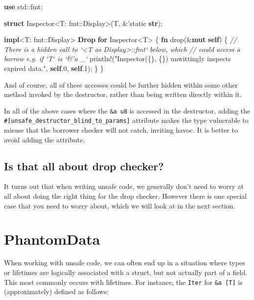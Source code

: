 \documentclass[a4paper,]{book}
\newenvironment{Shaded}{\begin{snugshade}}{\end{snugshade}}
\newcommand{\KeywordTok}[1]{\textcolor[rgb]{0.13,0.29,0.53}{\textbf{{#1}}}}
\newcommand{\DecValTok}[1]{\textcolor[rgb]{0.00,0.00,0.81}{{#1}}}
\newcommand{\StringTok}[1]{\textcolor[rgb]{0.31,0.60,0.02}{{#1}}}
\newcommand{\CommentTok}[1]{\textcolor[rgb]{0.56,0.35,0.01}{\textit{{#1}}}}
\newcommand{\OtherTok}[1]{\textcolor[rgb]{0.56,0.35,0.01}{{#1}}}
\newcommand{\NormalTok}[1]{{#1}}
\begin{document}
\begin{Shaded}
\begin{Highlighting}[]
\KeywordTok{use} \NormalTok{std::fmt;}

\KeywordTok{struct} \NormalTok{Inspector<T: fmt::Display>(T, &}\OtherTok{'static} \KeywordTok{str}\NormalTok{);}

\KeywordTok{impl}\NormalTok{<T: fmt::Display> }\KeywordTok{Drop} \KeywordTok{for} \NormalTok{Inspector<T> \{}
    \KeywordTok{fn} \NormalTok{drop(&}\KeywordTok{mut} \KeywordTok{self}\NormalTok{) \{}
        \CommentTok{// There is a hidden call to `<T as Display>::fmt` below, which}
        \CommentTok{// could access a borrow e.g. if `T` is `&'a _`}
        \OtherTok{println!}\NormalTok{(}\StringTok{"Inspector(\{\}, \{\}) unwittingly inspects expired data."}\NormalTok{,}
                 \KeywordTok{self}\NormalTok{.}\DecValTok{0}\NormalTok{, }\KeywordTok{self}\NormalTok{.}\DecValTok{1}\NormalTok{);}
    \NormalTok{\}}
\NormalTok{\}}
\end{Highlighting}
\end{Shaded}

And of course, all of these accesses could be further hidden within some
other method invoked by the destructor, rather than being written
directly within it.

In all of the above cases where the \texttt{\&\textquotesingle{}a\ u8}
is accessed in the destructor, adding the
\texttt{\#{[}unsafe\_destructor\_blind\_to\_params{]}} attribute makes
the type vulnerable to misuse that the borrower checker will not catch,
inviting havoc. It is better to avoid adding the attribute.

\subsection{Is that all about drop
checker?}\label{is-that-all-about-drop-checker}

It turns out that when writing unsafe code, we generally don't need to
worry at all about doing the right thing for the drop checker. However
there is one special case that you need to worry about, which we will
look at in the next section.

\section{PhantomData}\label{sec--phantom-data}

When working with unsafe code, we can often end up in a situation where
types or lifetimes are logically associated with a struct, but not
actually part of a field. This most commonly occurs with lifetimes. For
instance, the \texttt{Iter} for \texttt{\&\textquotesingle{}a\ {[}T{]}}
is (approximately) defined as follows:
\end{document}

